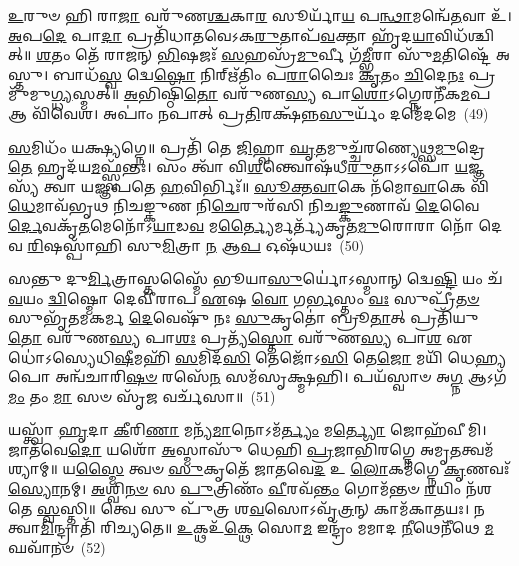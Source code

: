 {\anuvakamend[{\-\ul{𑌕𑍃}\-\-\ul{𑌣𑍋}\-\-\ul{𑌤𑍁} 𑌤𑌾\-\ul{𑌨}\-𑌷𑍍𑌟𑌾𑌚᳴𑌤𑍍𑌵𑌾𑌰𑌿𑍞𑌶𑌚𑍍𑌚}]}%

\-\ul{𑌉}\-𑌰𑍁𑍞 𑌹𑌿 𑌰𑌾\-\ul{𑌜𑌾} 𑌵𑌰𑍁᳴𑌣\-\ul{𑌶𑍍𑌚}\-𑌕𑌾\-\ul{𑌰} 𑌸𑍂𑌰𑍍𑌯𑌾᳴\-\ul{𑌯} 𑌪\-\ul{𑌨𑍍𑌥𑌾}\-𑌮𑌨𑍍𑌵𑍇᳴\-\ul{𑌤}\-𑌵𑌾 𑌉᳴। \ul{𑌅}\-𑌪\-\ul{𑌦𑍇} 𑌪𑌾\-\ul{𑌦𑌾} 𑌪𑍍𑌰𑌤𑌿᳴𑌧𑌾𑌤𑌵𑍇\-𑌽𑌕\-\ul{𑌰𑍁}\-𑌤𑌾𑌪᳴\-\ul{𑌵}\-𑌕𑍍𑌤𑌾 𑌹𑍃᳴𑌦\-\ul{𑌯𑌾}\-𑌵𑌿𑌧᳴𑌶𑍍𑌚𑌿𑌤𑍍॥ \ul{𑌶}\-𑌤𑌂 𑌤𑍇᳴ 𑌰𑌾𑌜𑌨𑍍 \ul{𑌭𑌿}\-𑌷𑌜𑌃᳴ \ul{𑌸}\-𑌹𑌸𑍍𑌰᳴\-\ul{𑌮𑍁}\-𑌰𑍍𑌵𑍀 𑌗᳴\-\ul{𑌮𑍍𑌭𑍀}\-𑌰𑌾 𑌸𑍁᳴\-\ul{𑌮}\-𑌤𑌿𑌷𑍍𑌟𑍇᳴ 𑌅𑌸𑍍𑌤𑍁। 𑌬𑌾𑌧᳴\-\ul{𑌸𑍍𑌵} 𑌦𑍍𑌵𑍇\-\ul{𑌷𑍋} 𑌨𑌿𑌰𑍍\mbox{}𑌋᳴𑌤𑌿𑌂 𑌪\-\ul{𑌰𑌾}\-𑌚𑍈𑌃 \ul{𑌕𑍃}\-𑌤𑌂 \ul{𑌚𑌿}\-𑌦𑍇\-\ul{𑌨𑌃} 𑌪𑍍𑌰 𑌮𑍁᳴𑌮𑍁\-\ul{𑌗𑍍𑌧𑍍𑌯}\-𑌸𑍍𑌮𑌤𑍍॥ \ul{𑌅}\-𑌭𑌿𑌷𑍍𑌠𑌿᳴\-\ul{𑌤𑍋} 𑌵𑌰𑍁᳴𑌣\-\ul{𑌸𑍍𑌯} 𑌪𑌾\-\ul{𑌶𑍋}\-\-𑌽𑌗𑍍𑌨𑍇𑌰𑌨𑍀᳴𑌕\-\ul{𑌮}\-𑌪 𑌆 𑌵𑌿᳴𑌵𑍇𑌶। 𑌅𑌪𑌾𑌂॑ 𑌨𑌪𑌾𑌤𑍍 𑌪𑍍𑌰\-\ul{𑌤𑌿}\-𑌰𑌕𑍍𑌷᳴𑌨𑍍𑌨\-\ul{𑌸𑍁}\-𑌰𑍍𑌯𑌂᳴ 𑌦𑌮𑍇᳴𑌦𑌮𑍇~(49)

\-\ul{𑌸}\-𑌮𑌿𑌧𑌂᳴ 𑌯𑌕𑍍𑌷𑍍𑌯𑌗𑍍𑌨𑍇॥ 𑌪𑍍𑌰𑌤𑌿᳴ 𑌤𑍇 \ul{𑌜𑌿}\-𑌹𑍍𑌵𑌾 \ul{𑌘𑍃}\-𑌤𑌮𑍁𑌚𑍍𑌚᳴𑌰𑌣𑍍𑌯𑍇𑌥𑍍𑌸\-\ul{𑌮𑍁}\-𑌦𑍍𑌰𑍇 \ul{𑌤𑍇} 𑌹𑍃𑌦᳴𑌯\-\ul{𑌮}\-𑌫𑍍𑌸𑍍𑌵᳴𑌨𑍍𑌤𑌃। 𑌸𑌂 𑌤𑍍𑌵𑌾᳴ 𑌵𑌿\-\ul{𑌶}\-𑌨𑍍𑌤𑍍𑌵𑍋𑌷᳴𑌧𑍀\-\ul{𑌰𑍁}\-𑌤𑌾\-𑌽\-𑌽𑌪𑍋᳴ \ul{𑌯}\-𑌜𑍍𑌞𑌸𑍍𑌯᳴ 𑌤𑍍𑌵𑌾 𑌯𑌜𑍍𑌞𑌪𑌤𑍇 \ul{𑌹}\-𑌵𑌿𑌰𑍍𑌭𑌿𑌃᳴॥ \ul{𑌸𑍂}\-\-\ul{𑌕𑍍𑌤}\-\-\ul{𑌵𑌾}\-𑌕𑍇 𑌨᳴𑌮𑍋\-\ul{𑌵𑌾}\-𑌕𑍇 𑌵𑌿᳴\-\ul{𑌧𑍇}\-𑌮𑌾𑌵᳴𑌭𑍃𑌥 𑌨𑌿𑌚𑌙𑍍𑌕𑍁𑌣 𑌨𑌿\-\ul{𑌚𑍇}\-𑌰𑍁𑌰᳴𑌸𑌿 𑌨𑌿𑌚\-\ul{𑌙𑍍𑌕𑍁}\-𑌣𑌾𑌵᳴ \ul{𑌦𑍇}\-𑌵𑍈\-\ul{𑌰𑍍𑌦𑍇}\-𑌵𑌕𑍃᳴\-\ul{𑌤}\-𑌮𑍇𑌨𑍋᳴\-𑌽\-\ul{𑌯𑌾}\-𑌡\-\ul{𑌵} 𑌮\-\ul{𑌰𑍍𑌤𑍍𑌯𑍈}\-𑌰𑍍𑌮𑌰𑍍𑌤𑍍𑌯᳴𑌕𑍃𑌤\-\ul{𑌮𑍁}\-𑌰𑍋𑌰𑌾 𑌨𑍋᳴ 𑌦𑍇𑌵 \ul{𑌰𑌿}\-𑌷𑌸𑍍𑌪𑌾᳴𑌹𑌿 𑌸𑍁\-\ul{𑌮𑌿}\-𑌤𑍍𑌰𑌾 \ul{𑌨} 𑌆\-\ul{𑌪} 𑌓𑌷᳴𑌧𑌯𑌃~(50)

𑌸𑌨𑍍𑌤𑍁 𑌦𑍁\-\ul{𑌰𑍍𑌮𑌿}\-𑌤𑍍𑌰𑌾𑌸𑍍𑌤𑌸𑍍𑌮𑍈᳴ 𑌭𑍂𑌯𑌾\-\ul{𑌸𑍁}\-𑌰𑍍𑌯𑍋॑\-𑌽𑌸𑍍𑌮𑌾𑌨𑍍 𑌦𑍍𑌵𑍇\-\ul{𑌷𑍍𑌟𑌿} 𑌯𑌂 𑌚᳴ \ul{𑌵}\-𑌯𑌂 \ul{𑌦𑍍𑌵𑌿}\-𑌷𑍍𑌮𑍋 𑌦𑍇𑌵𑍀᳴𑌰𑌾𑌪 \ul{𑌏}\-𑌷 \ul{𑌵𑍋} 𑌗\-\ul{𑌰𑍍𑌭}\-𑌸𑍍𑌤𑌂 \ul{𑌵𑌃} 𑌸𑍁𑌪𑍍𑌰𑍀᳴\-\ul{𑌤}\-\-\ul{𑍞} 𑌸𑍁𑌭𑍃᳴𑌤𑌮𑌕𑌰𑍍𑌮 \ul{𑌦𑍇}\-𑌵𑍇𑌷𑍁᳴ 𑌨𑌃 \ul{𑌸𑍁}\-𑌕𑍃𑌤𑍋॑ 𑌬𑍍𑌰𑍂\-\ul{𑌤𑌾}\-𑌤𑍍 𑌪𑍍𑌰𑌤𑌿᳴𑌯𑍁\-\ul{𑌤𑍋} 𑌵𑌰𑍁᳴𑌣\-\ul{𑌸𑍍𑌯} 𑌪𑌾\-\ul{𑌶𑌃} 𑌪𑍍𑌰𑌤𑍍𑌯᳴\-\ul{𑌸𑍍𑌤𑍋} 𑌵𑌰𑍁᳴𑌣\-\ul{𑌸𑍍𑌯} 𑌪𑌾\-\ul{𑌶} 𑌏𑌧𑍋॑\-𑌽𑌸𑍍𑌯𑍇𑌧𑌿\-\ul{𑌷𑍀}\-𑌮𑌹𑌿᳴ \ul{𑌸}\-𑌮𑌿𑌦᳴\-\ul{𑌸𑌿} 𑌤𑍇𑌜𑍋᳴\-𑌽\-\ul{𑌸𑌿} 𑌤𑍇\-\ul{𑌜𑍋} 𑌮𑌯𑌿᳴ 𑌧𑍇\-\ul{𑌹𑍍𑌯}\-𑌪𑍋 𑌅𑌨𑍍𑌵᳴𑌚𑌾𑌰𑌿\-\ul{𑌷}\-\-\ul{𑍞} 𑌰𑌸𑍇᳴\-\ul{𑌨} 𑌸𑌮᳴𑌸𑍃𑌕𑍍𑌷𑍍𑌮𑌹𑌿। 𑌪𑌯᳴𑌸𑍍𑌵𑌾𑍞 𑌅\-\ul{𑌗𑍍𑌨} 𑌆\-𑌽𑌗᳴\-\ul{𑌮𑌂} 𑌤𑌂 \ul{𑌮𑌾} 𑌸𑍞 𑌸𑍃᳴\-\ul{𑌜} 𑌵𑌰𑍍𑌚᳴𑌸𑌾॥~(51)

{\anuvakamend[{𑌦𑌮𑍇᳴𑌦\-\ul{𑌮} 𑌓𑌷᳴𑌧\-\ul{𑌯} 𑌆 𑌷𑌟𑍍 𑌚᳴}]}%

𑌯𑌸𑍍𑌤𑍍𑌵𑌾᳴ \ul{𑌹𑍃}\-𑌦𑌾 \ul{𑌕𑍀}\-𑌰𑌿\-\ul{𑌣𑌾} 𑌮𑌨𑍍𑌯᳴\-\ul{𑌮𑌾}\-𑌨𑍋\-𑌽𑌮᳴\-\ul{𑌰𑍍𑌤𑍍𑌯𑌂} 𑌮\-\ul{𑌰𑍍𑌤𑍍𑌯𑍋} 𑌜𑍋𑌹᳴𑌵𑍀𑌮𑌿। 𑌜𑌾𑌤᳴𑌵𑍇\-\ul{𑌦𑍋} 𑌯𑌶𑍋᳴ \ul{𑌅}\-𑌸𑍍𑌮𑌾𑌸𑍁᳴ 𑌧𑍇𑌹𑌿 \ul{𑌪𑍍𑌰}\-𑌜𑌾𑌭𑌿᳴𑌰𑌗𑍍𑌨𑍇 𑌅𑌮𑍃\-\ul{𑌤}\-𑌤𑍍𑌵𑌮᳴𑌶𑍍𑌯𑌾𑌮𑍍॥ 𑌯\-\ul{𑌸𑍍𑌮𑍈} 𑌤𑍍𑌵𑍞 \ul{𑌸𑍁}\-𑌕𑍃𑌤𑍇᳴ 𑌜𑌾𑌤𑌵𑍇\-\ul{𑌦} 𑌉 \ul{𑌲𑍋}\-𑌕𑌮᳴𑌗𑍍𑌨𑍇 \ul{𑌕𑍃}\-𑌣𑌵𑌃᳴ \ul{𑌸𑍍𑌯𑍋}\-𑌨𑌮𑍍। \ul{𑌅}\-𑌶𑍍𑌵𑌿\-\ul{𑌨}\-\-\ul{𑍞} 𑌸 \ul{𑌪𑍁}\-𑌤𑍍𑌰𑌿𑌣𑌂᳴ \ul{𑌵𑍀}\-𑌰𑌵᳴\-\ul{𑌨𑍍𑌤𑌂} 𑌗𑍋𑌮᳴𑌨𑍍𑌤𑍞 \ul{𑌰}\-𑌯𑌿𑌂 𑌨᳴𑌶𑌤𑍇 \ul{𑌸𑍍𑌵}\-𑌸𑍍𑌤𑌿॥ 𑌤𑍍𑌵𑍇 𑌸𑍁 𑌪𑍁᳴𑌤𑍍𑌰 𑌶\-\ul{𑌵}\-𑌸𑍋\-𑌽𑌵𑍃᳴\-\ul{𑌤𑍍𑌰}\-𑌨𑍍 𑌕𑌾𑌮᳴𑌕𑌾𑌤𑌯𑌃। 𑌨 𑌤𑍍𑌵𑌾\-\ul{𑌮𑌿}\-𑌨𑍍𑌦𑍍𑌰𑌾𑌤𑌿᳴ 𑌰𑌿𑌚𑍍𑌯𑌤𑍇॥ \ul{𑌉}\-𑌕𑍍𑌥𑌉᳴\-\ul{𑌕𑍍𑌥𑍇} 𑌸𑍋\-\ul{𑌮} 𑌇𑌨𑍍𑌦𑍍𑌰𑌂᳴ 𑌮𑌮𑌾𑌦 \ul{𑌨𑍀}\-𑌥𑍇𑌨𑍀᳴𑌥𑍇 \ul{𑌮}\-𑌘𑌵𑌾᳴𑌨𑍞~(52)

